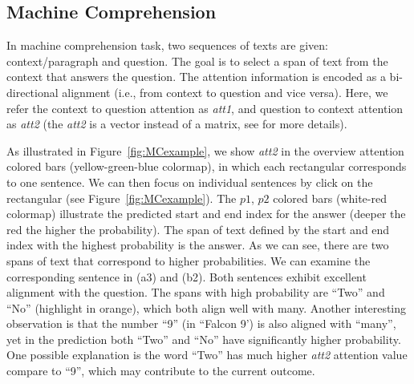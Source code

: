 \subsection{Machine Comprehension}
\label{sec:MCexample}
In machine comprehension task, two sequences of texts are given: context/paragraph and question.
The goal is to select a span of text from the context that answers the question. 
The attention information is encoded as a bi-directional alignment (i.e., from context to question and vice versa). 
Here, we refer the context to question attention as \emph{att1}, and question to context attention as \emph{att2} (the \emph{att2} is a vector instead of a matrix, see \cite{Seo2016} for more details).

As illustrated in Figure~\ref{fig:MCexample}, we show \emph{att2} in the overview attention colored bars (yellow-green-blue colormap), in which each rectangular corresponds to one sentence. We can then focus on individual sentences by click on the rectangular (see Figure~\ref{fig:MCexample}).
The $p1$, $p2$ colored bars (white-red colormap) illustrate the predicted start and end index for the answer (deeper the red the higher the probability). The span of text defined by the start and end index with the highest probability is the answer.
%
As we can see, there are two spans of text that correspond to higher probabilities. We can examine the corresponding sentence in (a3) and (b2). Both sentences exhibit excellent alignment with the question. The spans with high probability are ``Two'' and ``No'' (highlight in orange), which both align well with many.
Another interesting observation is that the number ``9'' (in ``Falcon 9') is also aligned with ``many'', yet in the prediction both ``Two'' and ``No'' have significantly higher probability.
One possible explanation is the word ``Two'' has much higher \emph{att2} attention value compare to ``9'', which may contribute to the current outcome.
